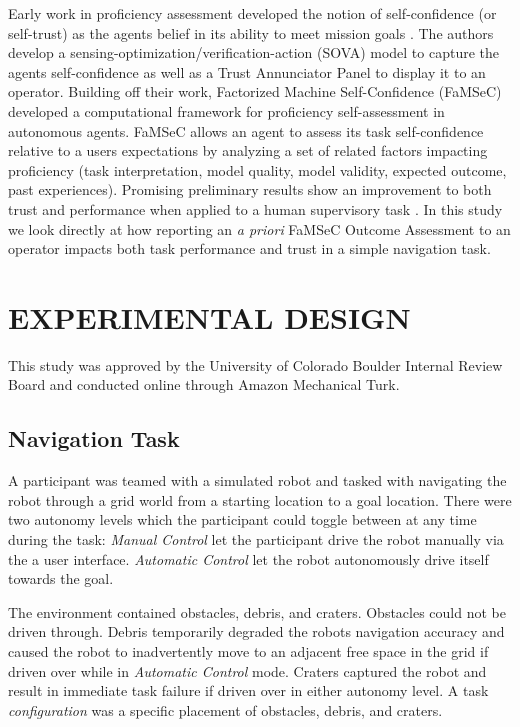 \documentclass[aaai]{article}
\begin{document}
Early work in proficiency assessment developed the notion of self-confidence (or self-trust) as the agents belief in its ability to meet mission goals \cite{Hutchins2015}. The authors develop a sensing-optimization/verification-action (SOVA) model to capture the agents self-confidence as well as a Trust Annunciator Panel to display it to an operator. Building off their work, Factorized Machine Self-Confidence (FaMSeC) \cite{israelsen2019ConfPaper,aitken2016Thesis} developed a computational framework for proficiency self-assessment in autonomous agents. FaMSeC allows an agent to assess its task self-confidence relative to a users expectations by analyzing a set of related factors impacting proficiency (task interpretation, model quality, model validity, expected outcome, past experiences). Promising preliminary results show an improvement to both trust and performance when applied to a human supervisory task  \cite{israelsenThesis}. In this study we look directly at how reporting an \textit{a priori} FaMSeC Outcome Assessment to an operator impacts both task performance and trust in a simple navigation task.

\section{EXPERIMENTAL DESIGN}\label{METHODS}
This study was approved by the University of Colorado Boulder Internal Review Board and conducted online through Amazon Mechanical Turk.

\subsection{Navigation Task}
A participant was teamed with a simulated robot and tasked with navigating the robot through a grid world from a starting location to a goal location. There were two autonomy levels which the participant could toggle between at any time during the task: \textit{Manual Control} let the participant drive the robot manually via the a user interface. \textit{Automatic Control} let the robot autonomously drive itself towards the goal. 

The environment contained obstacles, debris, and craters. Obstacles could not be driven through. Debris temporarily degraded the robots navigation accuracy and caused the robot to inadvertently move to an adjacent free space in the grid if driven over while in \emph{Automatic Control} mode. Craters captured the robot and result in immediate task failure if driven over in either autonomy level. A task \textit{configuration} was a specific placement of obstacles, debris, and craters.
\end{document}
